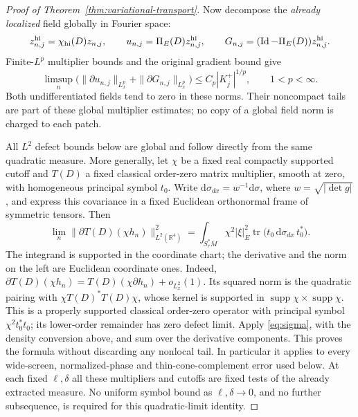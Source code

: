 \documentclass[11pt,a4paper]{article}
\numberwithin{equation}{section}
\newcommand{\Id}{\operatorname{Id}}
\newcommand{\supp}{\operatorname{supp}}
\newcommand{\dd}{\mathrm d}
\theoremstyle{definition}
\begin{document}
\begin{proof}[Proof of Theorem~\ref{thm:variational-transport}]
Now decompose the \emph{already localized} field globally in Fourier
space:
\begin{equation*}
z_{n,j}^{\rm hi}=\chi_{\rm hi}(D)z_{n,j},\qquad
u_{n,j}=\Pi_E(D)z_{n,j}^{\rm hi},\qquad
G_{n,j}=(\Id-\Pi_E(D))z_{n,j}^{\rm hi}.
\end{equation*}
Finite-$L^p$ multiplier bounds and the original gradient bound give
\begin{equation}\label{eq:var-local-volume}
\limsup_n\bigl(\|\partial u_{n,j}\|_{L^p_x}+
                      \|\partial G_{n,j}\|_{L^p_x}\bigr)
\leq C_p|K_j^+|^{1/p},\qquad 1<p<\infty.
\end{equation}
Both undifferentiated fields tend to zero in these norms. Their
noncompact tails are part of these global multiplier estimates; no
copy of a global field norm is charged to each patch.

All $L^2$ defect bounds below are global and follow directly from the
same quadratic measure. More generally, let $\chi$ be a fixed real
compactly supported cutoff and $T(D)$ a fixed classical order-zero
matrix multiplier, smooth at zero, with homogeneous principal symbol
$t_0$. Write $\dd\sigma_{dx}=w^{-1}\dd\sigma$, where
$w=\sqrt{|\det g|}$, and express this covariance in a fixed Euclidean
orthonormal frame of symmetric tensors. Then
\begin{equation}\label{eq:var-global-defect-norm}
\lim_n\|\partial T(D)(\chi h_n)\|_{L^2(\mathbb R^4)}^2
=\int_{S_r^*M}\chi^2|\xi|_E^2
       \operatorname{tr}\bigl(t_0\,\dd\sigma_{dx}\,t_0^*\bigr).
\end{equation}
The integrand is supported in the coordinate chart; the derivative
and the norm on the left are Euclidean coordinate ones. Indeed,
$\partial T(D)(\chi h_n)=T(D)(\chi\partial h_n)+o_{L^2_x}(1)$.
Its squared norm is the quadratic pairing with
$\chi T(D)^*T(D)\chi$, whose kernel is supported in
$\supp\chi\times\supp\chi$. This is a properly supported classical
order-zero operator with principal symbol $\chi^2t_0^*t_0$;
its lower-order remainder has zero defect limit. Apply
\eqref{eq:sigma}, with the density conversion above, and sum over
the derivative components. This proves the formula without
discarding any nonlocal tail. In particular it applies to
every wide-screen, normalized-phase and thin-cone-complement error
used below. At each fixed $\ell,\delta$ all these multipliers and
cutoffs are fixed tests of the already extracted measure. No
uniform symbol bound as $\ell,\delta\to0$, and no further subsequence,
is required for this quadratic-limit identity.


\end{proof}
\end{document}
